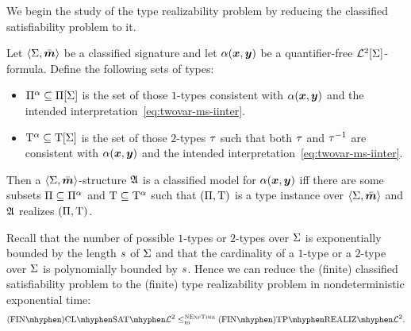 We begin the study of the type realizability problem by reducing the
classified satisfiability problem to it.

\begin{remark}\label{rem:red-sat-to-real}
Let $\left\langle \mathrm{\Sigma},\bar{\bm{m}} \right\rangle$ be a classified signature and let $\alpha(\bm{x},\bm{y})$ be a
quantifier-free $\mathcal{L}^{2}[\mathrm{\Sigma}]$-formula.
Define the following sets of types:
\begin{itemize}
  \item $\Pi^\alpha \subseteq \Pi[\mathrm{\Sigma}]$ is the set of those $1$-types
  consistent with $\alpha(\bm{x},\bm{y})$ and the intended
  interpretation~\cref{eq:twovar-ms-iinter}.
  \item $\mathrm{T}^\alpha \subseteq \mathrm{T}[\mathrm{\Sigma}]$ is the set of those $2$-types $\tau$
  such that both $\tau$ and $\tau^{-1}$ are consistent with $\alpha(\bm{x},\bm{y})$
  and the intended interpretation~\cref{eq:twovar-ms-iinter}.
\end{itemize}
Then a $\left\langle \mathrm{\Sigma},\bar{\bm{m}} \right\rangle$-structure $\mathfrak{A}$ is a classified model for
$\alpha(\bm{x},\bm{y})$ iff there are some subsets $\Pi \subseteq \Pi^\alpha$ and
$\mathrm{T} \subseteq \mathrm{T}^\alpha$ such that $(\Pi,\mathrm{T})$ is a type instance
over $\left\langle \mathrm{\Sigma},\bar{\bm{m}} \right\rangle$ and $\mathfrak{A}$ realizes $(\Pi,\mathrm{T})$.

Recall that the number of possible $1$-types or $2$-types over $\mathrm{\Sigma}$ is
exponentially bounded by the length $s$ of $\mathrm{\Sigma}$ and that the cardinality
of a $1$-type or a $2$-type over $\mathrm{\Sigma}$ is polynomially bounded by $s$.
Hence we can reduce the (finite) classified satisfiability problem to the
(finite) type realizability problem in nondeterministic exponential time:
\[
  \FinAClSat{\vFo2} \red\cNExpTime \FinAReal{\vFo2}.
\]
\end{remark}



